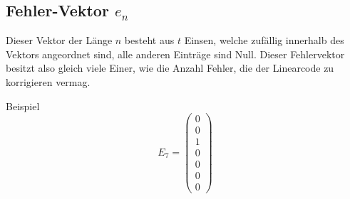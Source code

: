 \subsection{Fehler-Vektor $e_n$
\label{mceliece:subsection:p_m}}
Dieser Vektor der Länge $n$ besteht aus $t$ Einsen, welche zufällig innerhalb des Vektors angeordnet sind,
alle anderen Einträge sind Null.
Dieser Fehlervektor besitzt also gleich viele Einer,
wie die Anzahl Fehler, die der Linearcode zu korrigieren vermag.

Beispiel
\[
    E_7=
    \begin{pmatrix}
        0\\
        0\\
        1\\
        0\\
        0\\
        0\\
        0
    \end{pmatrix}
\]
